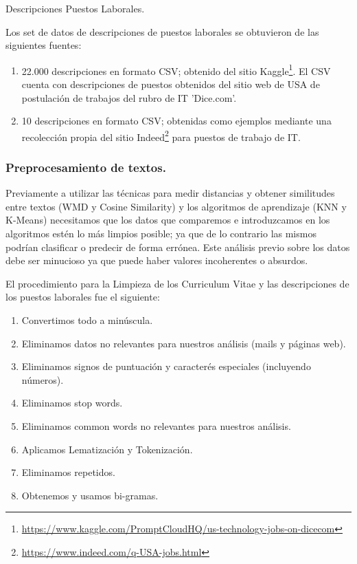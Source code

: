 \documentclass[12pt,a4paper]{article}
\makeatletter
\renewcommand\paragraph{\@startsection{paragraph}{4}{\z@}
            {-2.5ex\@plus -1ex \@minus -.25ex}
            {1.25ex \@plus .25ex}
            {\normalfont\normalsize\bfseries}}
\makeatother
\begin{document}
\begin{sloppypar}
\paragraph{Descripciones Puestos Laborales.}

Los set de datos de descripciones de puestos laborales se obtuvieron de las siguientes fuentes:

\begin{enumerate}
\item 22.000 descripciones en formato CSV; obtenido del sitio Kaggle\footnote{\url{https://www.kaggle.com/PromptCloudHQ/us-technology-jobs-on-dicecom}}. El CSV cuenta con descripciones de puestos obtenidos del sitio web de USA de postulación de trabajos del rubro de IT 'Dice.com'.
\item 10 descripciones en formato CSV; obtenidas como ejemplos mediante una recolección propia del sitio Indeed\footnote{\url{https://www.indeed.com/q-USA-jobs.html}} para puestos de trabajo de IT.
\end{enumerate}

\cleardoublepage

\subsubsection{Preprocesamiento de textos.}
Previamente a utilizar las técnicas para medir distancias y obtener similitudes entre textos (WMD y Cosine Similarity) y los algoritmos de aprendizaje (KNN y K-Means) necesitamos que los datos que comparemos e introduzcamos en los algoritmos estén lo más limpios posible; ya que de lo contrario las mismos podrían clasificar o predecir de forma errónea. Este análisis previo sobre los datos debe ser minucioso ya que puede haber valores incoherentes o absurdos.

El procedimiento para la Limpieza de los Curriculum Vitae y las descripciones de los puestos laborales fue el siguiente:

\begin{enumerate}
\item Convertimos todo a minúscula.
\item Eliminamos datos no relevantes para nuestros análisis (mails y páginas web).
\item Eliminamos signos de puntuación y caracterés especiales (incluyendo números).
\item Eliminamos stop words.
\item Eliminamos common words no relevantes para nuestros análisis.
\item Aplicamos Lematización y Tokenización.
\item Eliminamos repetidos.
\item Obtenemos y usamos bi-gramas.
\end{enumerate}


\end{sloppypar}
\end{document}
